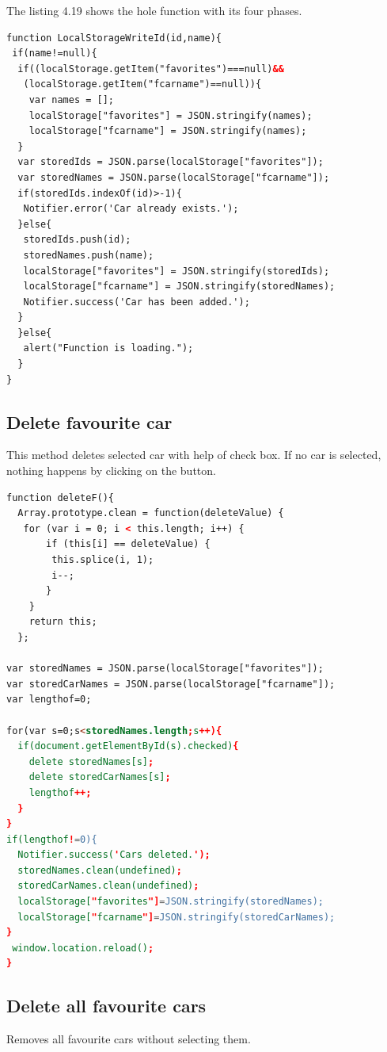 The listing 4.19 shows the hole function with its four phases.\\
\begin{lstlisting}[language=html, caption= 
Save car function,captionpos=b]
function LocalStorageWriteId(id,name){
 if(name!=null){
  if((localStorage.getItem("favorites")===null)&&
   (localStorage.getItem("fcarname")==null)){
	var names = [];
	localStorage["favorites"] = JSON.stringify(names);
	localStorage["fcarname"] = JSON.stringify(names);
  }		
  var storedIds = JSON.parse(localStorage["favorites"]);
  var storedNames = JSON.parse(localStorage["fcarname"]);	
  if(storedIds.indexOf(id)>-1){
   Notifier.error('Car already exists.');
  }else{
   storedIds.push(id);
   storedNames.push(name);
   localStorage["favorites"] = JSON.stringify(storedIds);
   localStorage["fcarname"] = JSON.stringify(storedNames);
   Notifier.success('Car has been added.');
  }
  }else{
   alert("Function is loading.");
  }
}
\end{lstlisting}



\subsection{Delete favourite car}
This method deletes selected car with help of check box. If no car is selected, nothing happens by clicking on the button.
\\

\begin{lstlisting}[language=html, caption= 
Delete function,captionpos=b]
function deleteF(){
  Array.prototype.clean = function(deleteValue) {
   for (var i = 0; i < this.length; i++) {
       if (this[i] == deleteValue) {         
        this.splice(i, 1);
	    i--;
	   }
    }
    return this;
  };
	
var storedNames = JSON.parse(localStorage["favorites"]); 
var storedCarNames = JSON.parse(localStorage["fcarname"]); 
var lengthof=0;

for(var s=0;s<storedNames.length;s++){
  if(document.getElementById(s).checked){
    delete storedNames[s];
    delete storedCarNames[s];
	lengthof++;
  }		
}
if(lengthof!=0){
  Notifier.success('Cars deleted.');
  storedNames.clean(undefined);
  storedCarNames.clean(undefined);
  localStorage["favorites"]=JSON.stringify(storedNames);
  localStorage["fcarname"]=JSON.stringify(storedCarNames);
}
 window.location.reload();
}
\end{lstlisting}

\subsection{Delete all favourite cars}
Removes all favourite cars without selecting them.


